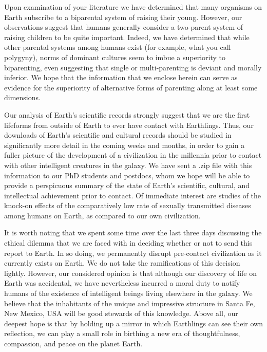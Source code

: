 Upon examination of your literature we have determined that many organisms on Earth subscribe to a biparental system of raising their young. However, our observations suggest that humans generally consider a two-parent system of raising children to be quite important. Indeed, we have determined that while other parental systems among humans exist (for example, what you call polygyny), norms of dominant cultures seem to imbue a superiority to biparenting, even suggesting that single or multi-parenting is deviant and morally inferior. We hope that the information that we enclose herein can serve as evidence for the superiority of alternative forms of parenting along at least some dimensions.


 


Our analysis of Earth's scientific records strongly suggest that we are the first lifeforms from outside of Earth to ever have contact with Earthlings. Thus, our downloads of Earth's scientific and cultural records should be studied in significantly more detail in the coming weeks and months, in order to gain a fuller picture of the development of a civilization in the millennia prior to contact with other intelligent creatures in the galaxy. We have sent a .zip file with this information to our PhD students and postdocs, whom we hope will be able to provide a perspicuous summary of the state of Earth's scientific, cultural, and intellectual achievement prior to contact. Of immediate interest are studies of the knock-on effects of the comparatively low rate of sexually transmitted diseases among humans on Earth, as compared to our own civilization.\par 


It is worth noting that we spent some time over the last three days discussing the ethical dilemma that we are faced with in deciding whether or not to send this report to Earth. In so doing, we permanently disrupt pre-contact civilization as it currently exists on Earth. We do not take the ramifications of this decision lightly. However, our considered opinion is that although our discovery of life on Earth was accidental, we have nevertheless incurred a moral duty to notify humans of the existence of intelligent beings living elsewhere in the galaxy. We believe that the inhabitants of the unique and impressive structure in Santa Fe, New Mexico, USA will be good stewards of this knowledge. Above all, our deepest hope is that by holding up a mirror in which Earthlings can see their own reflection, we can play a small role in birthing a new era of thoughtfulness, compassion, and peace on the planet Earth.\par 

